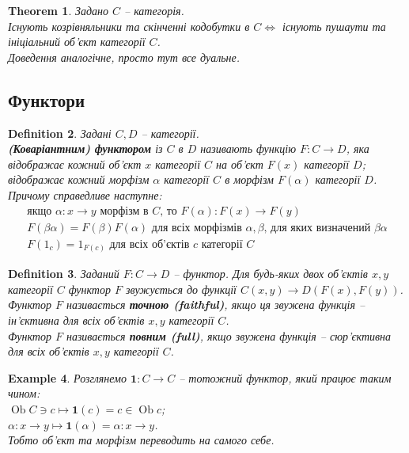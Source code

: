 \documentclass[a4paper, 10pt]{article}
\theoremstyle{theoremdd}
\newtheorem{theorem}{Theorem}[subsection]
\newtheorem{definition}[theorem]{Definition}
\newtheorem{example}[theorem]{Example}
\DeclareMathOperator{\Ob}{Ob}
\begin{document}
\begin{theorem}
Задано $C$ -- категорія.\\
Існують козрівняльники та скінченні кодобутки в $C \iff$ існують пушаути та ініціальний об'єкт категорії $C$.\\
\textit{Доведення аналогічне, просто тут все дуальне.}
\end{theorem}

\subsection{Функтори}
\begin{definition}
Задані $C,D$ -- категорії.\\
\textbf{(Коваріантним) функтором} із $C$ в $D$ називають функцію $F \colon C \to D$, яка відображає кожний об'єкт $x$ категорії $C$ на об'єкт $F(x)$ категорії $D$; відображає кожний морфізм $\alpha$ категорії $C$ в морфізм $F(\alpha)$ категорії $D$. Причому справедливе наступне:
\begin{align*}
\text{якщо $\alpha \colon x \to y$ морфізм в $C$, то $F(\alpha) \colon F(x) \to F(y)$} \\
\text{$F(\beta \alpha) = F(\beta) F(\alpha)$ для всіх морфізмів $\alpha,\beta$, для яких визначений $\beta\alpha$} \\
\text{$F(1_c) = 1_{F(c)}$ для всіх об'єктів $c$ категорії $C$}
\end{align*}
\end{definition}

\begin{definition}
Заданий $F \colon C \to D$ -- функтор. Для будь-яких двох об'єктів $x,y$ категорії $C$ функтор $F$ звужується до функції $C(x,y) \to D(F(x),F(y))$.\\
Функтор $F$ називається \textbf{точною (faithful)}, якщо ця звужена функція -- ін'єктивна для всіх об'єктів $x,y$ категорії $C$.\\
Функтор $F$ називається \textbf{повним (full)}, якщо звужена функція -- сюр'єктивна для всіх об'єктів $x,y$ категорії $C$.
\end{definition}

\begin{example}
Розглянемо $\textbf{1} \colon C \to C$ -- тотожний функтор, який працює таким чином:\\
$\Ob C \ni c \mapsto \textbf{1}(c) = c \in \Ob c$;\\
$\alpha \colon x \to y \mapsto \textbf{1}(\alpha) = \alpha \colon x \to y$.\\
Тобто об'єкт та морфізм переводить на самого себе.
\end{example}
\end{document}
